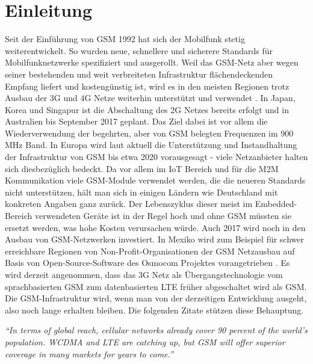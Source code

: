 \chapter{Einleitung} \label{hdl:einleitung}

Seit der Einführung von \ac{GSM} 1992 hat sich der Mobilfunk stetig weiterentwickelt. So wurden neue, schnellere und sicherere Standards für Mobilfunknetzwerke spezifiziert und ausgerollt. Weil das \ac{GSM}-Netz aber wegen seiner bestehenden und weit verbreiteten Infrastruktur flächendeckenden Empfang liefert und kostengünstig ist, wird es in den meisten Regionen trotz Ausbau der 3G und 4G Netze weiterhin unterstützt und verwendet \citep{opensignal}. In Japan, Korea und Singapur ist die Abschaltung des 2G Netzes bereits erfolgt und in Australien bis September 2017 geplant. Das Ziel dabei ist vor allem die Wiederverwendung der begehrten, aber von \ac{GSM} belegten Frequenzen im 900 MHz Band. In Europa wird laut \citet{heise:newsticker-3582914} aktuell die Unterstützung und Instandhaltung der Infrastruktur von \ac{GSM} bis etwa 2020 vorausgesagt - viele Netzanbieter halten sich diesbezüglich bedeckt. Da vor allem im \ac{IoT} Bereich und für die \ac{M2M} Kommunikation viele \ac{GSM}-Module verwendet werden, die die neueren Standards nicht unterstützen, hält man sich in einigen Ländern wie Deutschland mit konkreten Angaben ganz zurück. Der Lebenszyklus dieser meist im Embedded-Bereich verwendeten Geräte ist in der Regel hoch und ohne \ac{GSM} müssten sie ersetzt werden, was hohe Kosten verursachen würde. Auch 2017 wird noch in den Ausbau von \ac{GSM}-Netzwerken investiert. In Mexiko wird zum Beispiel für schwer erreichbare Regionen von Non-Profit-Organisationen der \ac{GSM} Netzausbau auf Basis von Open-Source-Software des Osmocom Projektes vorangetrieben \citep{osmocom:news-rhizomatica}. Es wird derzeit angenommen, dass das 3G Netz als Übergangstechnologie vom sprachbasierten \ac{GSM} zum datenbasierten \ac{LTE} früher abgeschaltet wird als \ac{GSM}. Die \ac{GSM}-Infrastruktur wird, wenn man von der derzeitigen Entwicklung ausgeht, also noch lange erhalten bleiben. Die folgenden Zitate stützen diese Behauptung.

\textit{"`In terms of global reach, cellular networks already cover 90 percent of the world’s population.
WCDMA and LTE are catching up, but GSM will offer superior coverage in many markets for
years to come."'} \citep{Ericsson:2016:Uen:284-23-3278}

